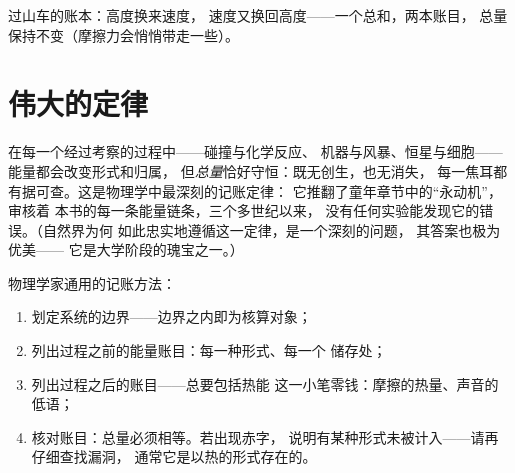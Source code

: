 \begin{omfigure}

{\small 过山车的账本：高度换来速度，
速度又换回高度——一个总和，两本账目，
总量保持不变（摩擦力会悄悄带走一些）。}
\end{omfigure}

\section{伟大的定律}

\begin{proposition}[能量守恒]\label{prop:g9:energy-conversions:conservation}
在每一个经过考察的过程中——碰撞与化学反应、
机器与风暴、恒星与细胞——能量都会改变形式和归属，
但\emph{总量}恰好守恒：既无创生，也无消失，
每一焦耳都有据可查。这是物理学中最深刻的记账定律：
它推翻了童年章节中的“永动机”，审核着
本书的每一条能量链条，三个多世纪以来，
没有任何实验能发现它的错误。（自然界为何
如此忠实地遵循这一定律，是一个深刻的问题，
其答案也极为优美——
它是大学阶段的瑰宝之一。）
\end{proposition}

\begin{method}[任何过程的能量核算]\label{met:g9:energy-conversions:audit}
物理学家通用的记账方法：
\begin{enumerate}
  \item 划定系统的边界——边界之内即为核算对象；
  \item 列出过程之前的能量账目：每一种形式、每一个
        储存处；
  \item 列出过程之后的账目——总要包括热能
        这一小笔零钱：摩擦的热量、声音的低语；
  \item 核对账目：总量必须相等。若出现赤字，
        说明有某种形式未被计入——请再仔细查找漏洞，
        通常它是以热的形式存在的。
\end{enumerate}
\end{method}

